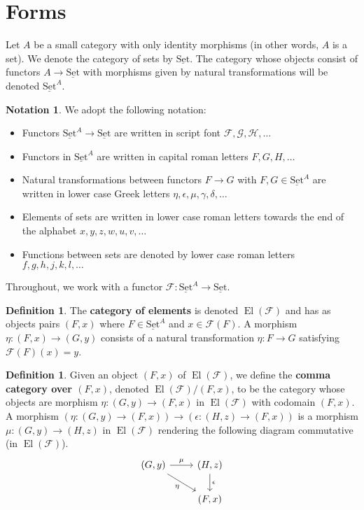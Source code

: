\documentclass[12pt]{article}
\theoremstyle{plain}
\theoremstyle{definition}
\newtheorem{defn}[thm]{Definition} %
\newtheorem{notation}[thm]{Notation}
\newcommand{\scr}[1]{\mathscr{#1}}
\newcommand{\lto}{\longrightarrow}
\newcommand{\set}{\operatorname{\underline{Set}}}
\begin{document}
	\section{Forms}
	Let $A$ be a small category with only identity morphisms (in other words, $A$ is a set). We denote the category of sets by $\set$. The category whose objects consist of functors $A \lto \set$ with morphisms given by natural transformations will be denoted $\set^A$.
	\begin{notation}
		We adopt the following notation:
		\begin{itemize}
			\item Functors $\set^A \lto \set$ are written in script font $\scr{F}, \scr{G}, \scr{H},\ldots$
			\item Functors in $\set^A$ are written in capital roman letters $F, G, H, \ldots$
			\item Natural transformations between functors $F \lto G$ with $F,G \in \set^A$ are written in lower case Greek letters $\eta, \epsilon, \mu, \gamma, \delta, \ldots$
			\item Elements of sets are written in lower case roman letters towards the end of the alphabet $x, y, z, w, u, v, \ldots$
			\item Functions between sets are denoted by lower case roman letters $f, g, h, j, k, l, \ldots$
			\end{itemize}
		\end{notation}
	Throughout, we work with a functor $\scr{F}: \set^A \lto \set$.
	\begin{defn}
		The \textbf{category of elements} is denoted $\operatorname{El}(\scr{F})$ and has as objects pairs $(F, x)$ where $F \in \set^A$ and $x \in \scr{F}(F)$. A morphism $\eta: (F,x) \lto (G,y)$ consists of a natural transformation $\eta: F \lto G$ satisfying $\scr{F}(F)(x) = y$.
	\end{defn}
\begin{defn}
	Given an object $(F,x)$ of $\operatorname{El}(\scr{F})$, we define the \textbf{comma category over $(F,x)$}, denoted $\operatorname{El}(\scr{F})/(F,x)$, to be the category whose objects are morphism $\eta: (G,y) \lto (F,x)$ in $\operatorname{El}(\scr{F})$ with codomain $(F,x)$. A morphism $(\eta: (G,y) \to (F,x)) \lto (\epsilon: (H,z) \to (F,x))$ is a morphism $\mu: (G,y) \lto (H,z)$ in $\operatorname{El}(\scr{F})$ rendering the following diagram commutative (in $\operatorname{El}(\scr{F})$).
	\begin{equation}
		\begin{tikzcd}
			(G,y)\arrow[r,"{\mu}"]\arrow[dr,swap,"{\eta}"] & (H,z)\arrow[d,"{\epsilon}"]\\
			& (F,x)
			\end{tikzcd}
		\end{equation}
	\end{defn}
\end{document}
